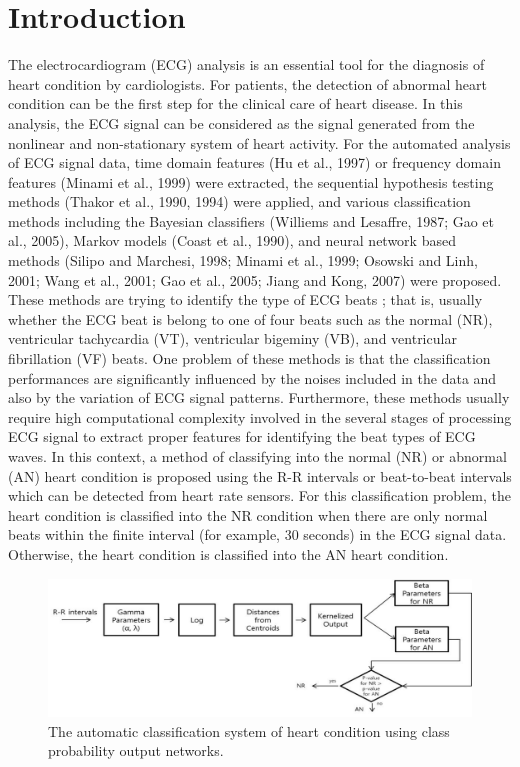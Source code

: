\documentclass[times,twocolumn,final,authoryear]{elsarticle}
\begin{document}
\section{Introduction}
\label{sec1}

The electrocardiogram (ECG) analysis is an essential tool for the diagnosis of heart condition by cardiologists. For patients, the detection of abnormal heart condition can be the first step for the clinical care of heart disease. In this analysis, the ECG signal can be considered as the signal generated from the nonlinear and non-stationary system of heart activity. For the automated analysis of ECG signal data, time domain features (Hu et al., 1997) or frequency domain features 
(Minami et al., 1999) were extracted, the sequential hypothesis testing methods (Thakor et al., 1990, 1994) were applied,
and various classification methods including the Bayesian classifiers (Williems and Lesaffre, 1987; Gao et al., 2005), Markov models (Coast et al., 1990), and neural network based methods (Silipo and Marchesi, 1998; Minami et al., 1999; Osowski and Linh, 2001; Wang et al., 2001; 
Gao et al., 2005; Jiang and Kong, 2007) were proposed. These methods are trying to identify the type of ECG beats ; that is, usually whether the ECG beat is belong to one of four beats such as the normal (NR), ventricular tachycardia (VT), ventricular bigeminy (VB), and ventricular fibrillation (VF) beats. One problem of these methods is that the classification performances are significantly influenced by the noises included in the data and also by the variation of ECG signal patterns. Furthermore, these methods 
usually require high computational complexity involved in the several stages of processing ECG signal to extract proper features for identifying 
the beat types of ECG waves.
In this context, a method of classifying into the normal (NR) or abnormal (AN) heart condition is proposed using the R-R intervals or beat-to-beat intervals
which can be detected from heart rate sensors. For this classification problem, the heart condition is classified into the NR condition when there are only normal beats within the finite interval (for example, 30 seconds) in the ECG signal data. Otherwise, the heart condition is classified into the AN heart condition.


\begin{figure}[!t]
\centering
\includegraphics[width=17.4cm]{Fig_1.pdf}
\caption{The automatic classification system of heart condition using class probability output networks.}
\label{fig_system}
\end{figure}
\end{document}
